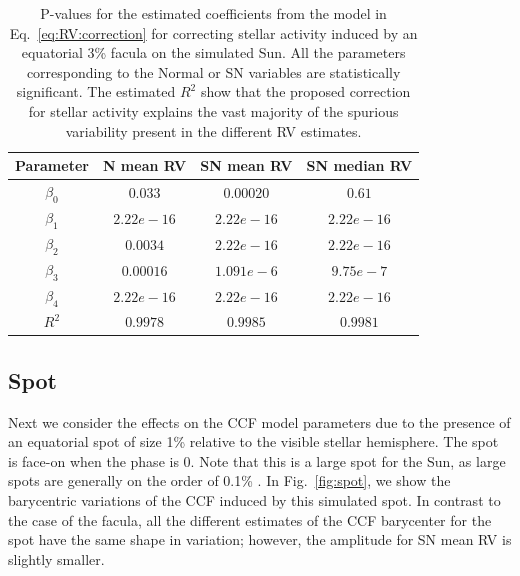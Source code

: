 \documentclass{aa}
\begin{document}
\begin{table}
\begin{center}
\caption{P-values for the estimated coefficients from the model in Eq.~\eqref{eq:RV:correction} for correcting stellar activity induced by an equatorial 3\% facula on the simulated Sun. All the parameters corresponding to the Normal or SN variables are statistically significant. The estimated $R^{2}$ show that the proposed correction for stellar activity explains the vast majority of the spurious variability present in the different RV estimates.}
\label{table:faculae.test}
\begin{tabular}{|c|c|c|c|}
\hline
Parameter          & N mean RV         &   SN mean RV &   SN median RV \\
\hline
$\beta_{0}$            &    $0.033$    & $0.00020$ & $0.61$ \\
\hline
$\beta_{1}$            &    $2.22e-16 $    & $2.22e-16 $ & $2.22e-16 $ \\
\hline
$\beta_{2}$            &     $0.0034$   &  $2.22e-16 $ & $2.22e-16 $\\
\hline
$\beta_{3}$            &     $0.00016$   &  $1.091e-6$ & $9.75e-7$\\
\hline
$\beta_{4}$            &     $2.22e-16$   &  $2.22e-16$ & $2.22e-16$\\
\hline
$R^{2}$      &     $0.9978$    &  $0.9985$ & $0.9981$  \\
\hline
\end{tabular}
\end{center}
\end{table}










\subsection{Spot} \label{sec:soap.spot}

Next we consider the effects on the CCF model parameters due to the presence of an equatorial spot of size 1\% relative to the visible stellar hemisphere. 
The spot is face-on when the phase is 0. 
Note that this is a large spot for the Sun, as large spots are generally on the order of 0.1\% \citep[e.g.][]{Borgniet-2015}. 
In Fig.~\ref{fig:spot}, we show the barycentric variations of the CCF induced by this simulated spot. 
In contrast to the case of the facula, all the different estimates of the CCF barycenter for the spot have the same shape in variation; however, the amplitude for SN mean RV is slightly smaller.
\end{document}
